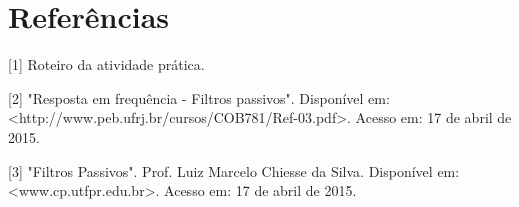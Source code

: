 \newpage
\section{Referências}

[1] Roteiro da atividade prática.
\vspace{0.5cm}

[2] "Resposta em frequência - Filtros passivos". Disponível em: <http://www.peb.ufrj.br/cursos/COB781/Ref-03.pdf>. Acesso em: 17 de
abril de 2015.
\vspace{0.5cm}

[3] "Filtros Passivos". Prof. Luiz Marcelo Chiesse da Silva. Disponível em: <www.cp.utfpr.edu.br>. Acesso em: 17 de abril de 2015.